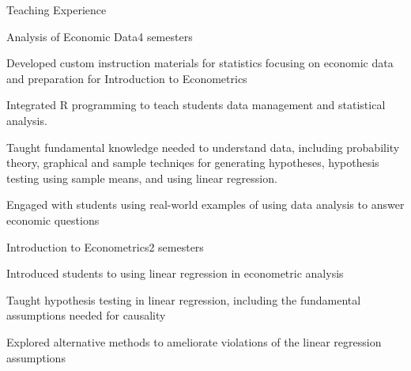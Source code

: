 \documentclass{resume} %
\begin{document}
\begin{rSection}{Teaching Experience}
    \begin{rSubsection}{Analysis of Economic Data}{4 semesters}{}{}
        \item Developed custom instruction materials for statistics focusing on economic data and preparation for Introduction to Econometrics
        \item Integrated R programming to teach students data management and statistical analysis.
        \item Taught fundamental knowledge needed to understand data, including probability theory, graphical and sample techniqes for generating hypotheses, hypothesis testing using sample means, and using linear regression. 
        \item Engaged with students using real-world examples of using data analysis to answer economic questions
    \end{rSubsection}
    \begin{rSubsection}{Introduction to Econometrics}{2 semesters}{}{}
        \item Introduced students to using linear regression in econometric analysis
        \item Taught hypothesis testing in linear regression, including the fundamental assumptions needed for causality
        \item Explored alternative methods to ameliorate violations of the linear regression assumptions
        \item 
        
    \end{rSubsection}
\end{rSection}
\end{document}
